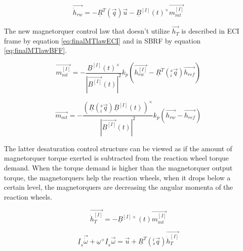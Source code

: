 \begin{equation}
\label{eq:newmomDumpDynECI}
\vec{\dot{h}_{rw}} = -\underline{R}^T(\vec{ q})\vec{u} -  \underline{B}^{[I]}(t)^\times \vec{m_{mt}^{[I]}}
\end{equation}

The new magnetorquer control law that doesn't utilize $\vec{h_T}$ is described in ECI frame by equation \ref{eq:finalMTlawECI} and in SBRF by equation \ref{eq:finalMTlawBFF}.

\begin{equation}
\vec{m_{mt}^{[I]}} 
= - \frac{\underline{B}^{[I]}(t)^\times} {|\vec{B^{[I]}}(t) |^2} k_p\left(\vec{h_{rw}^{[I]}} - \underline{R}^T(^s_i\vec{ q})\vec{h_{ref}} \right)
\label{eq:finalMTlawECI}
\end{equation}

\begin{equation}
\vec{m_{mt}} 
= - \frac{\left( \underline{R}(^s_i\vec{ q}) \underline{B}^{[I]}(t)\right)^\times} {|\vec{B^{[I]}}(t) |^2} k_p\left(\vec{h_{rw}} - \vec{h_{ref}} \right)
\label{eq:finalMTlawBFF}
\end{equation}

The latter desaturation control structure can be viewed as if the amount of magnetorquer torque exerted is subtracted from the reaction wheel torque demand. When the torque demand is higher than the magnetorquer output torque, the magnetorquers help the reaction wheels, when it drops below a certain level, the magnetorquers are decreasing the angular momenta of the reaction wheels.


\begin{equation}
\label{eq:totalMomDyn}
\vec{\dot{h}_T^{[I]}} = -\underline{B}^{[I]\times}(t) \vec{m_{mt}^{[I]}} 
\end{equation}		

\begin{equation}
\underline I_{s} \vec{\dot{\omega}} + \underline{\omega}^\times\underline I_{s} \vec{\omega} =    
\vec{u} +  \underline{R}^T(^i_s\vec{q})\vec{\dot{h}_T^{[I]}}
\label{eq:newDesatDynInterpret}
\end{equation}
		
		

		
		
